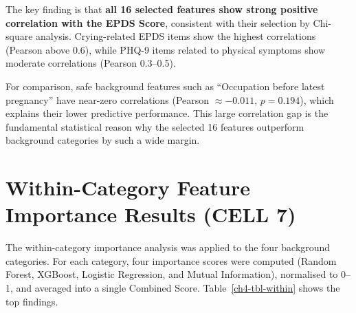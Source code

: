 The key finding is that \textbf{all 16 selected features show strong positive correlation with the EPDS Score}, consistent with their selection by Chi-square analysis.
Crying-related EPDS items show the highest correlations (Pearson above 0.6), while PHQ-9 items related to physical symptoms show moderate correlations (Pearson 0.3--0.5).

For comparison, safe background features such as ``Occupation before latest pregnancy'' have near-zero correlations (Pearson $\approx -0.011$, $p = 0.194$), which explains their lower predictive performance.
This large correlation gap is the fundamental statistical reason why the selected 16 features outperform background categories by such a wide margin.

\section{Within-Category Feature Importance Results (CELL 7)}
\label{ch4-sec-within}

The within-category importance analysis was applied to the four background categories.
For each category, four importance scores were computed (Random Forest, XGBoost, Logistic Regression, and Mutual Information), normalised to 0--1, and averaged into a single Combined Score.
Table~\ref{ch4-tbl-within} shows the top findings.

